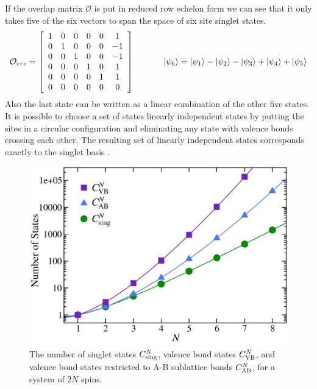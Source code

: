 \noindent If the overlap matrix $\mathcal{O}$ is put in reduced row echelon form we can see that it only takes five of the six vectors to span the space of six site singlet states.  
\begin{equation}
 \mathcal{O}_{rre} =
 \left[\begin{array}{cccccc}
		1&0&0&0&0&1\\
		0&1&0&0&0&-1\\
		0&0&1&0&0&-1\\
		0&0&0&1&0&1\\
		0&0&0&0&1&1\\
		0&0&0&0&0&0
		\end{array}\right] \hspace{1.2cm}
		\lvert {\psi_6} \rangle = \lvert {\psi_1} \rangle -\lvert {\psi_2} \rangle -\lvert {\psi_3} \rangle +\lvert {\psi_4} \rangle + \lvert {\psi_5} \rangle
\end{equation}
Also the last state can be written as a linear combination of the other five states.
It is possible to choose a set of states linearly independent states by putting the sites in a circular configuration and eliminating any state with valence bonds crossing each other.  
The resulting set of linearly independent states corresponds exactly to the singlet basis \cite{Beach2006}.
\begin{figure} {  
\centering
\includegraphics [width=4.5in]{./figures/made/fact.pdf} 
\caption[Comparison of number of states]{
The number of singlet states $C^N_{\rm sing}$, valence bond states $C^N_{\rm VB}$, and valence bond states restricted to A-B sublattice bonds $C^N_{\rm AB}$, for a system of $2N$ spins.}
 \label{statess}
 }
\end{figure}

%
%

